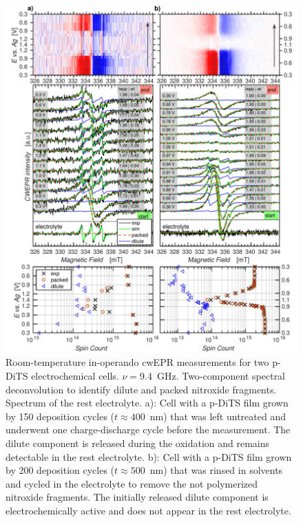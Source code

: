 \begin{figure}[!h]
\center
	\includegraphics[width=1\textwidth]{./operando_epr/figures/degradation/operando_degradation_dits.pdf}
\caption{Room-temperature in-operando cwEPR measurements for two p-DiTS electrochemical cells. $\nu=$9.4~GHz. Two-component spectral deconvolution to identify dilute and packed nitroxide fragments. Spectrum of the rest electrolyte. a): Cell with a p-DiTS film grown by 150 deposition cycles ($t\approx 400$~nm) that was left untreated and underwent one charge-discharge cycle before the measurement. The dilute component is released during the oxidation and remains detectable in the rest electrolyte. b): Cell with a p-DiTS film grown by 200 deposition cycles ($t\approx 500$~nm) that was rinsed in solvents and cycled in the electrolyte to remove the not polymerized nitroxide fragments. The initially released dilute component is electrochemically active and does not appear in the rest electrolyte.}
\label{fig:S6}
\end{figure}

